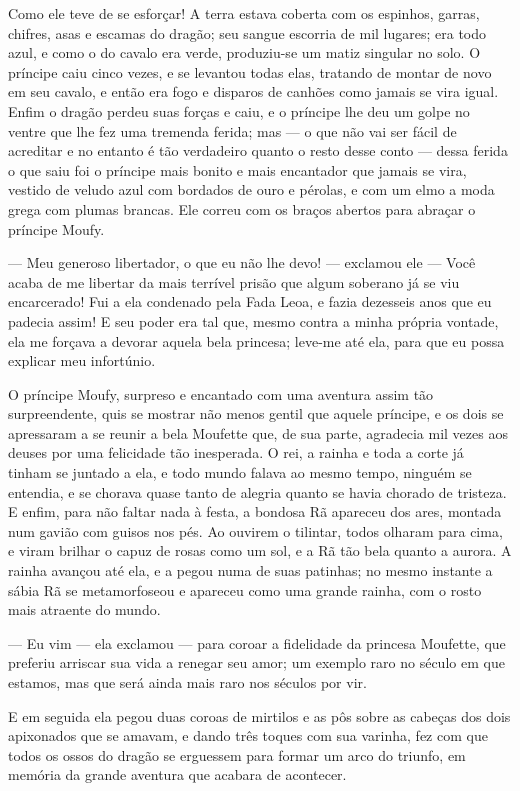Como ele teve de se esforçar! A terra estava coberta com os espinhos,
garras, chifres, asas e escamas do dragão; seu sangue escorria de mil
lugares; era todo azul, e como o do cavalo era verde, produziu-se um
matiz singular no solo. O príncipe caiu cinco vezes, e se levantou
todas elas, tratando de montar de novo em seu cavalo, e então era
fogo e disparos de canhões como jamais se vira igual. Enfim o dragão
perdeu suas forças e caiu, e o príncipe lhe deu um golpe no ventre
que lhe fez uma tremenda ferida; mas — o que não vai ser fácil de
acreditar e no entanto é tão verdadeiro quanto o resto desse conto —
dessa ferida o que saiu foi o príncipe mais bonito e mais encantador
que jamais se vira, vestido de veludo azul com bordados de ouro e
pérolas, e com um elmo a moda grega com plumas brancas. Ele correu
com os braços abertos para abraçar o príncipe Moufy. 

— Meu generoso libertador, o que eu não lhe devo! — exclamou ele —
Você acaba de me libertar da mais terrível prisão que algum soberano
já se viu encarcerado! Fui a ela condenado pela Fada Leoa, e fazia
dezesseis anos que eu padecia assim! E seu poder era tal que, mesmo
contra a minha própria vontade, ela me forçava a devorar aquela bela
princesa; leve-me até ela, para que eu possa explicar meu infortúnio.


O príncipe Moufy, surpreso e encantado com uma aventura assim tão
surpreendente, quis se mostrar não menos gentil que aquele príncipe,
e os dois se apressaram a se reunir a bela Moufette que, de sua
parte, agradecia mil vezes aos deuses por uma felicidade tão
inesperada. O rei, a rainha e toda a corte já tinham se juntado a
ela, e todo mundo falava ao mesmo tempo, ninguém se entendia, e se
chorava quase tanto de alegria quanto se havia chorado de tristeza. E
enfim, para não faltar nada à festa, a bondosa Rã apareceu dos ares,
montada num gavião com guisos nos pés. Ao ouvirem o tilintar, todos
olharam para cima, e viram brilhar o capuz de rosas como um sol, e a
Rã tão bela quanto a aurora. A rainha avançou até ela, e a pegou numa
de suas patinhas; no mesmo instante a sábia Rã se metamorfoseou e
apareceu como uma grande rainha, com o rosto mais atraente do mundo. 

— Eu vim — ela exclamou — para coroar a fidelidade da princesa
Moufette, que preferiu arriscar sua vida a renegar seu amor; um
exemplo raro no século em que estamos, mas que será ainda mais raro
nos séculos por vir.

E em seguida ela pegou duas coroas de mirtilos e as pôs sobre as
cabeças dos dois apixonados que se amavam, e dando três toques com
sua varinha, fez com que todos os ossos do dragão se erguessem para
formar um arco do triunfo, em memória da grande aventura que acabara
de acontecer. 

